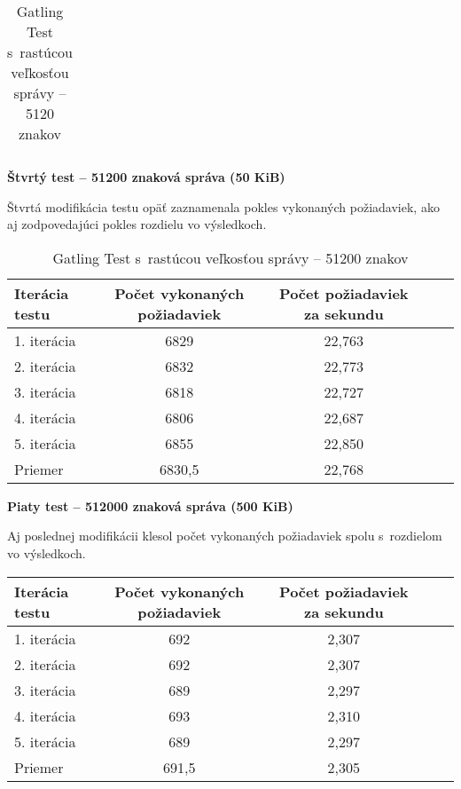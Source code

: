 \documentclass[12pt,oneside,final]{fithesis-utf8}
\begin{document}
\begin{itemize}
\begin{table}[H]
\begin{center}
\begin{tabular}{ | l | c | c | c | c |}
\end{tabular}
\end{center}
\caption{Gatling Test s~rastúcou veľkosťou správy -- 5120 znakov}
\end{table}


\textbf{Štvrtý test -- 51200 znaková správa (50 KiB)}

Štvrtá modifikácia testu opäť zaznamenala pokles vykonaných požiadaviek, ako aj zodpovedajúci pokles rozdielu vo výsledkoch.

\begin{table}[H]
\begin{center}
\begin{tabular}{ | l | c | c | c | c |}
		\hline
		 \textbf{Iterácia testu} & \textbf{Počet vykonaných požiadaviek} & \textbf{Počet požiadaviek za sekundu} \\ \hline
		 1. iterácia & 6829 & 22,763 \\ \hline
		 2. iterácia & 6832 & 22,773 \\ \hline
		 3. iterácia & 6818 & 22,727 \\ \hline
		 4. iterácia & 6806 & 22,687 \\ \hline
		 5. iterácia & 6855 & 22,850 \\ \hline
		 Priemer & 6830,5 & 22,768 \\ \hline
		 
\end{tabular}
\end{center}
\caption{Gatling Test s~rastúcou veľkosťou správy -- 51200 znakov}
\end{table}


\textbf{Piaty test -- 512000 znaková správa (500 KiB)}

Aj poslednej modifikácii klesol počet vykonaných požiadaviek spolu s~rozdielom vo výsledkoch.

\begin{table}[H]
\begin{center}
\begin{tabular}{ | l | c | c | c | c |}
		\hline
		 \textbf{Iterácia testu} & \textbf{Počet vykonaných požiadaviek} & \textbf{Počet požiadaviek za sekundu} \\ \hline
		 1. iterácia & 692 & 2,307 \\ \hline
		 2. iterácia & 692 & 2,307 \\ \hline
		 3. iterácia & 689 & 2,297 \\ \hline
		 4. iterácia & 693 & 2,310 \\ \hline
		 5. iterácia & 689 & 2,297 \\ \hline
		 Priemer & 691,5 & 2,305 \\ \hline
		 

\end{tabular}
\end{center}
\end{table}
\end{itemize}
\end{document}
